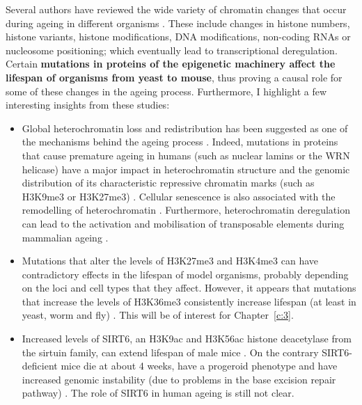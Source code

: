 \bigskip

Several authors have reviewed the wide variety of chromatin changes that occur during ageing in different organisms \citep{Booth2016,Benayoun2015a,Pal2016,Sen2016}. These include changes in histone numbers, histone variants, histone modifications, DNA modifications, non-coding RNAs or nucleosome positioning; which eventually lead to transcriptional deregulation. Certain \textbf{mutations in proteins of the epigenetic machinery affect the lifespan of organisms from yeast to mouse}, thus proving a causal role for some of these changes in the ageing process. Furthermore, I highlight a few interesting insights from these studies:

\begin{itemize}
	
	\item Global heterochromatin loss and redistribution has been suggested as one of the mechanisms behind the ageing process \citep{Villeponteau1997, Tsurumi2012}. Indeed, mutations in proteins that cause premature ageing in humans (such as nuclear lamins or the WRN helicase) have a major impact in heterochromatin structure and the genomic distribution of its characteristic repressive chromatin marks (such as H3K9me3 or H3K27me3) \citep{Zhang2015b}. Cellular senescence is also associated with the remodelling of heterochromatin \citep{Zhang2007}. Furthermore, heterochromatin deregulation can lead to the activation and mobilisation of transposable elements during mammalian ageing \citep{DeCecco2013}. 
	
	\item Mutations that alter the levels of H3K27me3 and H3K4me3 can have contradictory effects in the lifespan of model organisms, probably depending on the loci and cell types that they affect. However, it appears that mutations that increase the levels of H3K36me3 consistently increase lifespan (at least in yeast, worm and fly) \citep{Booth2016,Benayoun2015a,Pal2016,Sen2016}. This will be of interest for Chapter~\ref{c:3}.
	
	\item Increased levels of SIRT6, an H3K9ac and H3K56ac histone deacetylase from the sirtuin family, can extend lifespan of male mice \citep{Kanfi2012}. On the contrary SIRT6-deficient mice die at about 4 weeks, have a progeroid phenotype  and have increased genomic instability (due to problems in the base excision repair pathway) \citep{Mostoslavsky2006}. The role of SIRT6 in human ageing is still not clear. 
	

\end{itemize}
